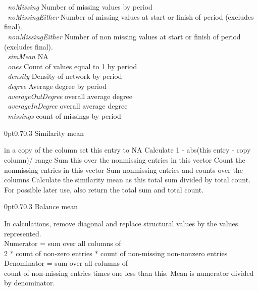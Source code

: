 \documentclass[12pt,a4paper]{article}
\makeatletter
\renewcommand{\=}{\,=\,}
\newcommand{\+}{\,+\,}
\newcommand{\nnm}[1]{\textsf{\textit{#1}}}
\renewcommand{\subsection}{\@startsection{subsection}{2}
                {0pt}{0.7\baselineskip}{0.3\baselineskip}
                {\sffamily} }
\newcommand{\sfn}[1]{\textbf{\texttt{#1}}}
\makeatother
\begin{document}
\begin{algorithmic}
\sfn{ }\nnm{noMissing} Number of missing values by period\\
\sfn{ }\nnm{noMissingEither} Number of missing values at start or finish of
period (excludes final).\\
\sfn{ }\nnm{nonMissingEither} Number of non missing values at start or finish of
period (excludes final).\\
\sfn{ }\nnm{simMean} NA\\
\sfn{ }\nnm{ones} Count of values equal to 1 by period\\
\sfn{ }\nnm{density} Density of network by period\\
\sfn{ }\nnm{degree} Average degree by period\\
\sfn{ }\nnm{averageOutDegree} overall average degree\\
\sfn{ }\nnm{averageInDegree} overall average degree\\
\sfn{ }\nnm{missings} count of missings by period\\
\ENDIF
\ENDIF
\end{algorithmic}
\subsection{Similarity mean}
\label{sec:similarityMean}
\begin{algorithmic}
\STATE in a copy of the column set this entry to NA
\STATE Calculate 1 - abs(this entry - copy column)/ range
\STATE Sum this over the nonmissing entries in this vector
\STATE Count the nonmissing entries in this vector
\ENDFOR
\ENDFOR
\STATE Sum nonmissing entries and counts over the columns
\STATE Calculate the similarity mean as this total sum divided by total count.
\STATE For possible later use, also return the total sum and total count.
\end{algorithmic}
\subsection{Balance mean}
\label{sec:balmean}
\begin{algorithmic}
\STATE In calculations, remove diagonal and replace structural values by the
values represented.\\
\STATE Numerator = sum over all columns of\\
2 * count of non-zero entries * count of non-missing non-nonzero entries\\
\STATE Denominator = sum over all columns of \\
count of non-missing entries times one less than this.
\STATE Mean is numerator divided by denominator.
\end{algorithmic}
\end{document}
